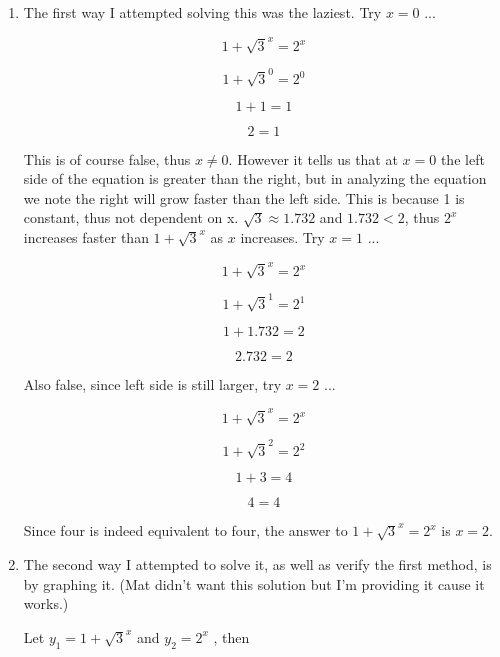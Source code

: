 \documentclass[12pt]{article}
\begin{document}
\begin{enumerate}[label=\textbf{\arabic*}.]

\item The first way I attempted solving this was the laziest. Try $x = 0$ ...

$$1 + \sqrt{3}^x = 2^{x}$$

$$1 + \sqrt{3}^0 = 2^{0}$$

$$1 + 1 = 1$$

$$2 = 1$$

This is of course false, thus $x \neq 0$. However it tells us that at $x = 0$ the left side of the equation is greater than the right, but in analyzing the equation we note the right will grow faster than the left side. This is because 1 is constant, thus not dependent on x. $\sqrt{3} \approx 1.732$ and $1.732 < 2$, thus $2^{x}$ increases faster than $1 + \sqrt{3}^x$ as $x$ increases. Try $x = 1$ ...

$$1 + \sqrt{3}^x = 2^{x}$$

$$1 + \sqrt{3}^1 = 2^{1}$$

$$1 + 1.732 = 2$$

$$2.732 = 2$$

Also false, since left side is still larger, try $x = 2$ ...

$$1 + \sqrt{3}^x = 2^{x}$$

$$1 + \sqrt{3}^2 = 2^{2}$$

$$1 + 3 = 4$$

$$4 = 4$$

Since four is indeed equivalent to four, the answer to $1 + \sqrt{3}^x = 2^{x}$ is $x = 2$.


\newpage

\item The second way I attempted to solve it, as well as verify the first method, is by graphing it. (Mat didn't want this solution but I'm providing it cause it works.)

Let $y_1 = 1 + \sqrt{3}^x$ and $y_2 = 2^{x}$ , then


\end{enumerate}
\end{document}
